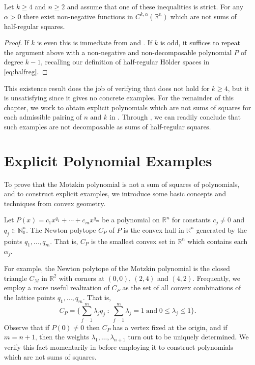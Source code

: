 \documentclass[oneside,hidelinks,indentfirst,10pt]{book}
\begin{document}
\begin{cor}\label{cor:existence}
Let \(k\geq 4\) and \(n\geq 2\) and assume that one of these inequalities is strict. For any \(\alpha>0\) there exist non-negative functions in \(C^{k,\alpha}(\mathbb{R}^n)\) which are not sums of half-regular squares.
\end{cor}


\begin{proof}
If \(k\) is even this is immediate from  and \cite{Hilbert}. If \(k\) is odd, it suffices to repeat the argument above with a non-negative and non-decomposable polynomial \(P\) of degree \(k-1\), recalling our definition of half-regular H\"older spaces in \eqref{eq:halfreg}. 
\end{proof}


This existence result does the job of verifying that  does not hold for \(k\geq 4\), but it is unsatisfying since it gives no concrete examples. For the remainder of this chapter, we work to obtain explicit polynomials which are not sums of squares for each admissible pairing of \(n\) and \(k\) in . Through , we can readily conclude that such examples are not decomposable as sums of half-regular squares.


\section{Explicit Polynomial Examples}\label{sec:examples}


To prove that the Motzkin polynomial is not a sum of squares of polynomials, and to construct explicit examples, we introduce some basic concepts and techniques from convex geometry. 


\begin{defn}
Let \(P(x)=c_1 x^{q_1}+\cdots+c_mx^{q_m}\) be a polynomial on \(\mathbb{R}^n\) for constants \(c_j\neq0\) and \(q_j\in\mathbb{N}_0^n\). The Newton polytope \(C_P\) of \(P\) is the convex hull in \(\mathbb{R}^n\) generated by the points \(q_1,\dots,q_m\). That is, \(C_P\) is the smallest convex set in \(\mathbb{R}^n\) which contains each \(\alpha_j\). 
\end{defn}


For example, the Newton polytope of the Motzkin polynomial is the closed triangle \(C_M\) in \(\mathbb{R}^2\) with corners at \((0,0)\), \((2,4)\) and \((4,2)\). Frequently, we employ a more useful realization of \(C_P\) as the set of all convex combinations of the lattice points \(q_1,\dots,q_m\). That is,
\[
    C_P=\bigg\{\sum_{j=1}^m\lambda_jq_j\;:\;\sum_{j=1}^m\lambda_j=1\;\mathrm{and}\;0\leq\lambda_j\leq 1\bigg\}.
\]
Observe that if \(P(0)\neq 0\) then \(C_P\) has a vertex fixed at the origin, and if \(m=n+1\), then the weights \(\lambda_1,\dots,\lambda_{n+1}\) turn out to be uniquely determined. We verify this fact momentarily in  before employing it to construct polynomials which are not sums of squares.
\end{document}
